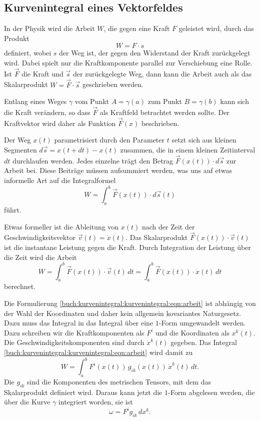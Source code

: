 %
%
\subsection{Kurvenintegral eines Vektorfeldes
\label{buch:kurvenintegral:subsection:kurvenintegralvektorfeld}}
In der Physik wird die Arbeit $W$, die gegen eine Kraft $F$ geleistet wird,
durch das Produkt
\[
W = F\cdot s
\]
definiert, wobei $s$ der Weg ist, der gegen den Widerstand der Kraft
zurückgelegt wird.
%
Dabei spielt nur die Kraftkomponente parallel zur Verschiebung eine Rolle.
Ist $\vec{F}$ die Kraft und $\vec{s}$ der zurückgelegte Weg, dann kann 
die Arbeit auch als das Skalarprodukt $W=\vec{F}\cdot\vec{s}$ geschrieben
werden.

Entlang eines Weges $\gamma$ vom Punkt $A=\gamma(a)$ zum Punkt
$B=\gamma(b)$ kann sich die Kraft verändern, so dass $\vec{F}$
als Kraftfeld betrachtet werden sollte.
Der Kraftvektor wird daher als Funktion $\vec{F}(x)$ beschrieben.

Der Weg $x(t)$ parametrisiert durch den Parameter $t$ setzt sich aus
kleinen Segmenten $d\vec{s} = x(t+dt)-x(t)$ zusammen, die in einem
kleinen Zeitinterval $dt$ durchlaufen werden.
Jedes einzelne trägt den Betrag $\vec{F}(x(t))\cdot d\vec{s}$ zur
Arbeit bei.
Diese Beiträge müssen aufsummiert werden, was uns auf etwas informelle
Art auf die Integralformel
\[
W
=
\int_a^b \vec{F}(x(t))\cdot d\vec{s}(t)
\]
führt.

Etwas formeller ist die Ableitung von $x(t)$ nach der Zeit
der Geschwindigkeitsvektor $\vec{v}(t)=\dot{x}(t)$.
Das Skalarprodukt $\vec{F}(x(t))\cdot \vec{v}(t)$ ist die
instantane Leistung gegen die Kraft.
Durch Integration der Leistung über die Zeit wird die Arbeit
\begin{equation}
W
=
\int_a^b \vec{F}(x(t))\cdot \vec{v}(t)\,dt
=
\int_a^b \vec{F}(x(t))\cdot \dot{x}(t)\,dt
\label{buch:kurvenintegral:kurvenintegral:eqn:arbeit}
\end{equation}
berechnet.

Die Formulierung \eqref{buch:kurvenintegral:kurvenintegral:eqn:arbeit}
ist abhängig von der Wahl der Koordinaten und daher kein allgemein 
kovariantes Naturgesetz.
%
Dazu muss das Integral in das Integral über eine $1$-Form umgewandelt
werden.
Dazu schreiben wir die Kraftkomponenten als $F^i$ und die Koordinaten
als $x^k(t)$.
Die Geschwindigkeitskomponenten sind durch $\dot{x}^k(t)$ gegeben.
Das Integral \eqref{buch:kurvenintegral:kurvenintegral:eqn:arbeit}
wird damit zu
\[
W
=
\int_a^b F^i(x(t))\,g_{ik}(x(t))\, \dot{x}^k(t)\,dt.
\]
Die $g_{ik}$ sind die Komponenten des metrischen Tensors, mit dem
das Skalarprodukt definiert wird.
Daraus kann jetzt die $1$-Form abgelesen werden, die über die
Kurve $\gamma$ integriert worden, sie ist
\[
\omega
=
F^ig_{ik}\,dx^k.
\]

